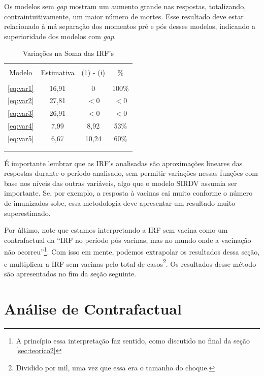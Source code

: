 \documentclass[
    article,
	12pt,				%
	oneside,			%
	a4paper,			%
	english,			%
	brazil,				%
	hyperref = {colorlinks, citecolor=c1d, linkcolor=c2d, urlcolor=c3d, colorlinks}
	]{abntex2}
\begin{document}
Os modelos sem \textit{gap} mostram um aumento grande nas respostas, totalizando, contraintuitivamente, um maior número de mortes. Esse resultado deve estar relacionado à má separação dos momentos pré e pós desses modelos, indicando a superioridade dos modelos com \textit{gap}.

\begin{table}[H]
\centering
\caption{Variações na Soma das IRF's}
\label{tb:irfsoma}
\begin{tabular}{cccc}
\\[-1.8ex]\hline 
\hline \\[-1.8ex] 
Modelo & Estimativa & (1) - (i) & \%\\\hline\\[-1.8ex]
\multicolumn{1}{c|}{\eqref{eq:var1}}    & 16,91  & 0     & 100\%\\ 
\multicolumn{1}{c|}{\eqref{eq:var2}}    & 27,81  & $<0$    & $<0$   \\ 
\multicolumn{1}{c|}{\eqref{eq:var3}}    & 26,91  & $<0$    & $<0$   \\
\multicolumn{1}{c|}{\eqref{eq:var4}}    & 7,99   & 8,92  & 53\% \\
\multicolumn{1}{c|}{\eqref{eq:var5}}    & 6,67   & 10,24 & 60\% \\
\\[-1.8ex]\hline 
\hline \\[-1.8ex] 
\end{tabular}
\end{table}

É importante lembrar que as IRF's analisadas são aproximações lineares das respostas durante o período analisado, sem permitir variações nessas funções com base nos níveis das outras variáveis, algo que o modelo SIRDV assumia ser importante. Se, por exemplo, a resposta à vacinas cai muito conforme o número de imunizados sobe, essa metodologia deve apresentar um resultado muito superestimado.

Por último, note que estamos interpretando a IRF sem vacina como um contrafactual da ``IRF no período pós vacinas, mas no mundo onde a vacinação não ocorreu''\footnote{A princípio essa interpretação faz sentido, como discutido no final da seção \ref{sec:teorico2}}. Com isso em mente, podemos extrapolar os resultados dessa seção, e multiplicar a IRF sem vacinas pelo total de casos\footnote{Dividido por mil, uma vez que essa era o tamanho do choque.}. Os resultados desse método são apresentados no fim da seção seguinte.


\section{Análise de Contrafactual}\label{sec:res2}
\end{document}

